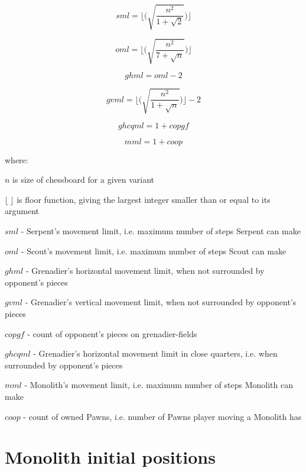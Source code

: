 \begin{equation}
sml = \lfloor \bigg( \sqrt{ \frac{n^2}{1 + \sqrt{2}} } \bigg) \rfloor
\end{equation}

\begin{equation}
oml = \lfloor \bigg( \sqrt{ \frac{n^2}{7 + \sqrt{n}} } \bigg) \rfloor
\end{equation}

\begin{equation}
ghml = oml - 2
\end{equation}

\begin{equation}
gvml = \lfloor \bigg( \sqrt{ \frac{n^2}{1 + \sqrt{n}} } \bigg) \rfloor - 2
\end{equation}

\begin{equation}
ghcqml = 1 + copgf
\end{equation}

\begin{equation}
mml = 1 + coop
\end{equation}

where:

$n$ is size of chessboard for a given variant

$\lfloor\ \rfloor$ is floor function, giving the largest integer smaller than
or equal to its argument

$sml$ - Serpent's movement limit, i.e. maximum number of steps Serpent can make

$oml$ - Scout's movement limit, i.e. maximum number of steps Scout can make

$ghml$ - Grenadier's horizontal movement limit, when not surrounded by opponent's pieces

$gvml$ - Grenadier's vertical movement limit, when not surrounded by opponent's pieces

$copgf$ - count of opponent's pieces on grenadier-fields

$ghcqml$ - Grenadier's horizontal movement limit in close quarters, i.e. when surrounded by opponent's pieces

$mml$ - Monolith's movement limit, i.e. maximum number of steps Monolith can make

$coop$ - count of owned Pawns, i.e. number of Pawns player moving a Monolith has

\clearpage %

\section*{Monolith initial positions}
\label{sec:Definitions/Monolith initial positions}

